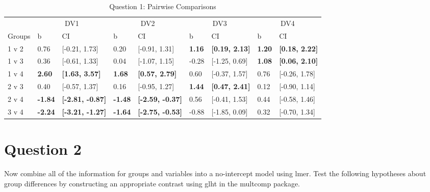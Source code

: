 \documentclass{article}\usepackage[]{graphicx}\usepackage[]{color}
\newenvironment{knitrout}{}{} %
\begin{document}
\begin{knitrout}
\begin{table}
\caption{\label{tab:unnamed-chunk-5}Question 1: Pairwise Comparisons}
\centering
\begin{tabular}[t]{lllllllll}
\toprule
\multicolumn{1}{c}{ } & \multicolumn{2}{c}{DV1} & \multicolumn{2}{c}{DV2} & \multicolumn{2}{c}{DV3} & \multicolumn{2}{c}{DV4} \\
\cmidrule(l{2pt}r{2pt}){2-3} \cmidrule(l{2pt}r{2pt}){4-5} \cmidrule(l{2pt}r{2pt}){6-7} \cmidrule(l{2pt}r{2pt}){8-9}
Groups & b & CI & b & CI & b & CI & b & CI\\
\midrule
1 v 2 & 0.76 & [-0.21, 1.73] & 0.20 & [-0.91, 1.31] & \textbf{1.16} & \textbf{[0.19, 2.13]} & \textbf{1.20} & \textbf{[0.18, 2.22]}\\
1 v 3 & 0.36 & [-0.61, 1.33] & 0.04 & [-1.07, 1.15] & -0.28 & [-1.25, 0.69] & \textbf{1.08} & \textbf{[0.06, 2.10]}\\
1 v 4 & \textbf{2.60} & \textbf{[1.63, 3.57]} & \textbf{1.68} & \textbf{[0.57, 2.79]} & 0.60 & [-0.37, 1.57] & 0.76 & [-0.26, 1.78]\\
2 v 3 & 0.40 & [-0.57, 1.37] & 0.16 & [-0.95, 1.27] & \textbf{1.44} & \textbf{[0.47, 2.41]} & 0.12 & [-0.90, 1.14]\\
2 v 4 & \textbf{-1.84} & \textbf{[-2.81, -0.87]} & \textbf{-1.48} & \textbf{[-2.59, -0.37]} & 0.56 & [-0.41, 1.53] & 0.44 & [-0.58, 1.46]\\
3 v 4 & \textbf{-2.24} & \textbf{[-3.21, -1.27]} & \textbf{-1.64} & \textbf{[-2.75, -0.53]} & -0.88 & [-1.85, 0.09] & 0.32 & [-0.70, 1.34]\\
\bottomrule
\end{tabular}
\end{table}


\end{knitrout}



\section{Question 2}
Now combine all of the information for groups and variables into a no-intercept model using lmer\( \). Test the following hypotheses about group differences by constructing an appropriate contrast using glht\( \) in the multcomp package. \\
\end{document}
